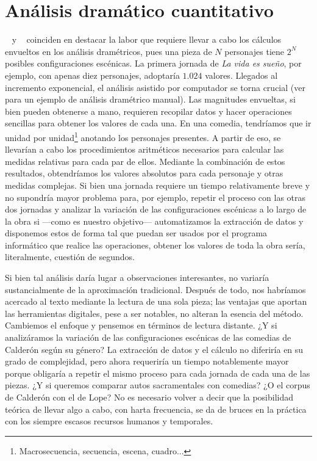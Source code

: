 \section{Análisis dramático cuantitativo}
\citeauthor{dinu1968}~\parencite*[34]{dinu1968} y  \citeauthor{marcus1973}~\parencite*[316]{marcus1973} coinciden en destacar la labor que requiere llevar a cabo los cálculos envueltos en los análisis dramétricos, pues una pieza de $N$ personajes tiene $2^N$ posibles configuraciones escénicas. La primera jornada de \textit{La vida es sueño}, por ejemplo, con apenas diez personajes, adoptaría $1{.}024$ valores. Llegados al incremento exponencial, el análisis asistido por computador se torna crucial (ver  para un ejemplo de análisis dramétrico manual). Las magnitudes envueltas, si bien pueden obtenerse a mano, requieren recopilar datos y hacer operaciones sencillas para obtener los valores de cada una. En una comedia, tendríamos que ir unidad por unidad\footnote{Macrosecuencia, secuencia, escena, cuadro...} anotando los personajes presentes. A partir de eso, se llevarían a cabo los procedimientos aritméticos necesarios para calcular las medidas relativas para cada par de ellos. Mediante la combinación de estos resultados, obtendríamos los valores absolutos para cada personaje y otras medidas complejas. Si bien una jornada requiere un tiempo relativamente breve y no supondría mayor problema para, por ejemplo, repetir el proceso con las otras dos jornadas y analizar la variación de las configuraciones escénicas a lo largo de la obra si —\nolinebreak como es nuestro objetivo\nolinebreak— automatizamos la extracción de datos y disponemos estos de forma tal que puedan ser usados por el programa informático que realice las operaciones, obtener los valores de toda la obra sería, literalmente, cuestión de segundos.

Si bien tal análisis daría lugar a observaciones interesantes, no variaría sustancialmente de la aproximación tradicional. Después de todo, nos habríamos acercado al texto mediante la lectura de una sola pieza; las ventajas que aportan las herramientas digitales, pese a ser notables, no alteran la esencia del método. Cambiemos el enfoque y pensemos en términos de lectura distante. ¿Y si analizáramos la variación de las configuraciones escénicas de las comedias de Calderón según su género? La extracción de datos y el cálculo no diferiría en su grado de complejidad, pero ahora requeriría un tiempo notablemente mayor porque obligaría a repetir el mismo proceso para cada jornada de cada una de las piezas. ¿Y si queremos comparar autos sacramentales con comedias? ¿O el corpus de Calderón con el de Lope? No es necesario volver a decir que la posibilidad teórica de llevar algo a cabo, con harta frecuencia, se da de bruces en la práctica con los siempre escasos recursos humanos y temporales.

